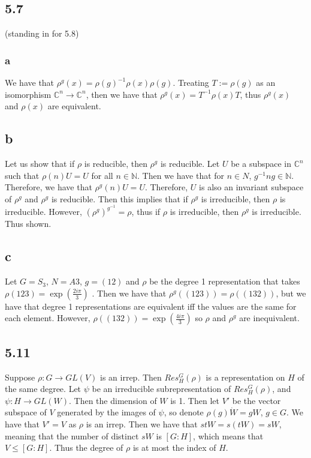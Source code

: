 \documentclass[]{article}
\begin{document}
\subsection*{5.7} (standing in for 5.8)

\subsubsection*{a}
We have that $\rho^g(x) = \rho(g)^{-1} \rho(x) \rho(g)$. Treating $T := \rho(g)$ as an isomorphism $\mathbb{C}^n \rightarrow \mathbb{C}^n$, then we have that $\rho^g(x) = T^{-1} \rho(x) T$, thus $\rho^g(x)$ and $\rho(x)$ are equivalent. 

\subsection*{b}
Let us show that if $\rho$ is reducible, then $\rho^g$ is reducible. Let $U$ be a subspace in $\mathbb{C}^n$ such that $\rho(n) U = U$ for all $n \in \mathbb{N}$. Then we have that for $n \in N$, $g^{-1} n g \in \mathbb{N}$. Therefore, we have that $\rho^g(n) U = U$. Therefore, $U$ is also an invariant subspace of $\rho^g$ and $\rho^g$ is reducible. Then this implies that if $\rho^g$ is irreducible, then $\rho$ is irreducible. However, $\left(\rho^g\right)^{g^{-1}} = \rho$, thus if $\rho$ is irreducible, then $\rho^g$ is irreducible. Thus shown. 
\subsection*{c}
Let $G = S_3$, $N = A3$, $g = (12)$ and $\rho$ be the degree 1 representation that takes $\rho(123) = \exp(\frac{2 i \pi}{3})$ . Then we have that $\rho^g((123)) = \rho((132))$, but we have that degree 1 representations are equivalent iff the values are the same for each element. However, $\rho((132)) = \exp(\frac{4 i \pi}{3})$ so $\rho$ and $\rho^g$ are inequivalent. 

\subsection*{5.11}
Suppose $\rho: G \rightarrow GL(V)$ is an irrep. Then $Res^G_H(\rho)$ is a representation on $H$ of the same degree. Let $\psi$ be an irreducible subrepresentation of $Res^G_H(\rho)$, and $\psi: H \rightarrow GL(W)$. Then the dimension of $W$ is 1. Then let $V'$ be the vector subspace of $V$ generated by the images of $\psi$, so denote $\rho(g) \dot W = gW$, $g \in G$. We have that $V' = V$ as $\rho$ is an irrep. Then we have that $stW = s (tW) = sW$, meaning that the number of distinct $sW$ is $[G : H]$, which means that $V \leq [G : H]$. Thus the degree of $\rho$ is at most the index of $H$. 
\end{document}
